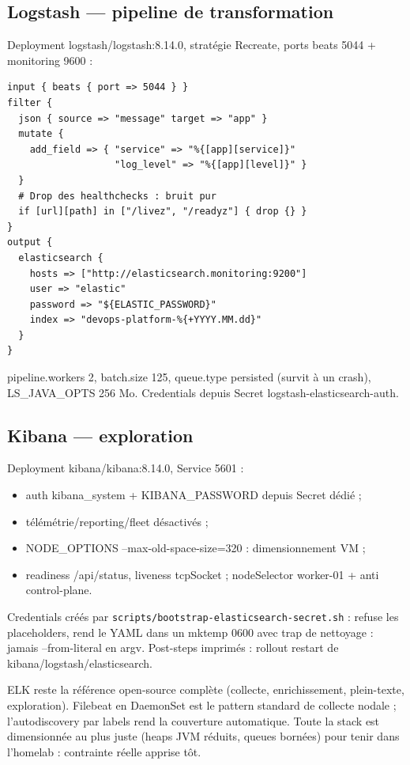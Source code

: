 \documentclass[12pt,a4paper,twoside,openright]{report}
\begin{document}
\subsection{Logstash --- pipeline de transformation}
Deployment logstash/logstash:8.14.0, stratégie Recreate, ports beats 5044 + monitoring 9600 :
\begin{lstlisting}[caption={Pipeline Logstash : filtrage et enrichissement}]
input { beats { port => 5044 } }
filter {
  json { source => "message" target => "app" }
  mutate {
    add_field => { "service" => "%{[app][service]}"
                   "log_level" => "%{[app][level]}" }
  }
  # Drop des healthchecks : bruit pur
  if [url][path] in ["/livez", "/readyz"] { drop {} }
}
output {
  elasticsearch {
    hosts => ["http://elasticsearch.monitoring:9200"]
    user => "elastic"
    password => "${ELASTIC_PASSWORD}"
    index => "devops-platform-%{+YYYY.MM.dd}"
  }
}
\end{lstlisting}

pipeline.workers 2, batch.size 125, queue.type persisted (survit à un crash), LS\_JAVA\_OPTS 256 Mo. Credentials depuis Secret logstash-elasticsearch-auth.

\subsection{Kibana --- exploration}
Deployment kibana/kibana:8.14.0, Service 5601 :
\begin{itemize}[itemsep=1pt]
  \item auth kibana\_system + KIBANA\_PASSWORD depuis Secret dédié ;
  \item télémétrie/reporting/fleet désactivés ;
  \item NODE\_OPTIONS --max-old-space-size=320 : dimensionnement VM ;
  \item readiness /api/status, liveness tcpSocket ; nodeSelector worker-01 + anti control-plane.
\end{itemize}

Credentials créés par \texttt{scripts/bootstrap-elasticsearch-secret.sh} : refuse les placeholders, rend le YAML dans un mktemp 0600 avec trap de nettoyage : jamais --from-literal en argv. Post-steps imprimés : rollout restart de kibana/logstash/elasticsearch.

\begin{whybox}
ELK reste la référence open-source complète (collecte, enrichissement, plein-texte, exploration). Filebeat en DaemonSet est le pattern standard de collecte nodale ; l'autodiscovery par labels rend la couverture automatique. Toute la stack est dimensionnée au plus juste (heaps JVM réduits, queues bornées) pour tenir dans l'homelab : contrainte réelle apprise tôt.
\end{whybox}
\end{document}

